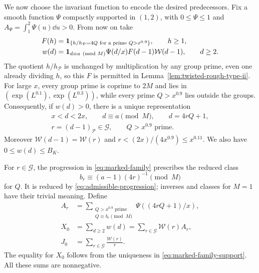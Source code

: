 We now choose the invariant function to encode the desired predecessors.
Fix a smooth function \(\Psi\) compactly supported in \((1,2)\), with
\(0\le\Psi\le1\) and \(A_\Psi=\int_1^2\Psi(u)\dd u>0\).  From now on take
\begin{equation}\label{eq:marked-family}
 \begin{split}
 F(h)&=\mathbf 1_{\{h/h_{\mathcal P}=4Q\text{ for a prime }Q>x^{0.9}\}},
       \qquad h\ge1,\\
 w(d)&=\mathbf 1_{d\equiv a\pmod M}\Psi(d/x)F(d-1)\mathcal W(d-1),
       \qquad d\ge2.
 \end{split}
\end{equation}
The quotient \(h/h_{\mathcal P}\) is unchanged by multiplication by any
group prime, even one already dividing \(h\), so this \(F\) is permitted
in Lemma~\ref{lem:twisted-rough-type-ii}.  For large \(x\), every group
prime is coprime to \(2M\) and lies in
\((\exp(L^{0.1}),\exp(L^{0.3}))\), while every prime \(Q>x^{0.9}\) lies
outside the groups.  Consequently, if \(w(d)>0\), there is a unique
representation
\begin{equation}\label{eq:marked-family-support}
 \begin{gathered}
 x<d<2x,\qquad d\equiv a\pmod M,\qquad d=4rQ+1,\\
 r=(d-1)_{\mathcal P}\in\mathcal G,\qquad Q>x^{0.9}\text{ prime}.
 \end{gathered}
\end{equation}
Moreover \(\mathcal W(d-1)=\mathcal W(r)\) and
\(r<(2x)/(4x^{0.9})\le x^{0.11}\).  We also have \(0\le w(d)\le B_K\).

For \(r\in\mathcal G\), the progression in \eqref{eq:marked-family}
prescribes the reduced class
\[
 b_r\equiv(a-1)(4r)^{-1}\pmod M
\]
for \(Q\).  It is reduced by \eqref{eq:admissible-progression}; inverses
and classes for \(M=1\) have their trivial meaning.  Define
\begin{equation}\label{eq:marked-mass-definitions}
 \begin{split}
 A_r&=\sum_{\substack{Q>x^{0.9}\text{ prime}\\Q\equiv b_r\pmod M}}
                  \Psi((4rQ+1)/x),\\
 X_0&=\sum_{d\ge2}w(d)=\sum_{r\in\mathcal G}\mathcal W(r)A_r,\\
 J_0&=\sum_{r\in\mathcal G}\frac{\mathcal W(r)}r.
 \end{split}
\end{equation}
The equality for \(X_0\) follows from the uniqueness in
\eqref{eq:marked-family-support}.  All these sums are nonnegative.

